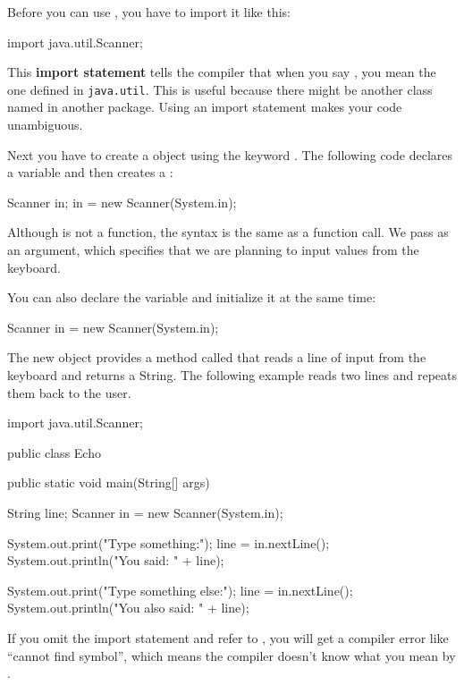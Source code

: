 Before you can use , you have to import it like this:

\begin{code}
import java.util.Scanner;
\end{code}

This {\bf import statement} tells the compiler that when you say , you mean the one defined in {\tt java.util}.  This
is useful because there might be another class named 
in another package.  Using an import statement makes your
code unambiguous.

Next you have
to create a  object using the keyword .
The following code declares a  variable and then creates a :

\begin{code}
    Scanner in;
    in = new Scanner(System.in);
\end{code}

Although  is not a function, the syntax is the same
as a function call.  We pass  as an
argument, which specifies that we are planning to input values from
the keyboard.


You can also declare the variable and initialize it at the same time:

\begin{code}
    Scanner in = new Scanner(System.in);
\end{code}

The new  object provides a method called  that reads a line of input from the keyboard and returns a String.
The following example reads two lines and repeats them back to the user.

\begin{code}
import java.util.Scanner;

public class Echo {

    public static void main(String[] args) {
        String line;
        Scanner in = new Scanner(System.in);

        System.out.print("Type something:");
        line = in.nextLine();
        System.out.println("You said: " + line);

        System.out.print("Type something else:");
        line = in.nextLine();
        System.out.println("You also said: " + line);
    }
}
\end{code}

If you omit the import statement and refer to , you will get a compiler error like ``cannot find symbol'', which means the compiler doesn't know what you mean by .

